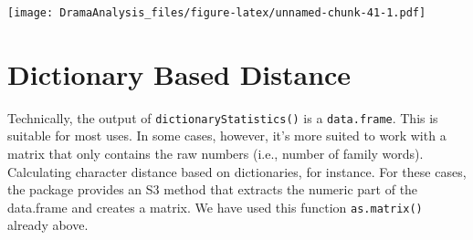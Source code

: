 \documentclass[]{book}
\newenvironment{Shaded}{\begin{snugshade}}{\end{snugshade}}
\newcommand{\CommentTok}[1]{\textcolor[rgb]{0.56,0.35,0.01}{\textit{#1}}}
\newcommand{\DataTypeTok}[1]{\textcolor[rgb]{0.13,0.29,0.53}{#1}}
\newcommand{\DecValTok}[1]{\textcolor[rgb]{0.00,0.00,0.81}{#1}}
\newcommand{\FloatTok}[1]{\textcolor[rgb]{0.00,0.00,0.81}{#1}}
\newcommand{\KeywordTok}[1]{\textcolor[rgb]{0.13,0.29,0.53}{\textbf{#1}}}
\newcommand{\NormalTok}[1]{#1}
\newcommand{\OperatorTok}[1]{\textcolor[rgb]{0.81,0.36,0.00}{\textbf{#1}}}
\newcommand{\OtherTok}[1]{\textcolor[rgb]{0.56,0.35,0.01}{#1}}
\newcommand{\StringTok}[1]{\textcolor[rgb]{0.31,0.60,0.02}{#1}}
\begin{document}
\begin{Shaded}
\end{Shaded}

\texttt{[image: DramaAnalysis\_files/figure-latex/unnamed-chunk-41-1.pdf]}

\hypertarget{dictionary-based-distance}{%
\section{Dictionary Based Distance}\label{dictionary-based-distance}}

Technically, the output of \texttt{dictionaryStatistics()} is a \texttt{data.frame}. This is suitable for most uses. In some cases, however, it's more suited to work with a matrix that only contains the raw numbers (i.e., number of family words). Calculating character distance based on dictionaries, for instance. For these cases, the package provides an S3 method that extracts the numeric part of the data.frame and creates a matrix. We have used this function \texttt{as.matrix()} already above.
\end{document}
